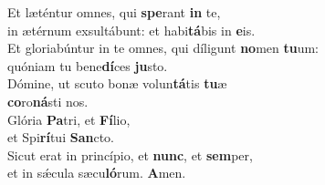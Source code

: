 \oddverse Et læténtur omnes, qui \textbf{spe}rant \textbf{in} te,~\*\\
\oddverse in ætérnum exsultábunt: et habi\textbf{tá}bis in \textbf{e}is.\\
\evenverse Et gloriabúntur in te omnes, qui díligunt \textbf{no}men \textbf{tu}um:~\*\\
\evenverse quóniam tu bene\textbf{dí}ces \textbf{ju}sto.\\
\oddverse Dómine, ut scuto bonæ volun\textbf{tá}tis \textbf{tu}æ~\*\\
\oddverse \textbf{co}ro\textbf{ná}sti nos.\\
\evenverse Glória \textbf{Pa}tri, et \textbf{Fí}lio,~\*\\
\evenverse et Spi\textbf{rí}tui \textbf{San}cto.\\
\oddverse Sicut erat in princípio, et \textbf{nunc}, et \textbf{sem}per,~\*\\
\oddverse et in sǽcula sæcu\textbf{ló}rum. \textbf{A}men.\\
